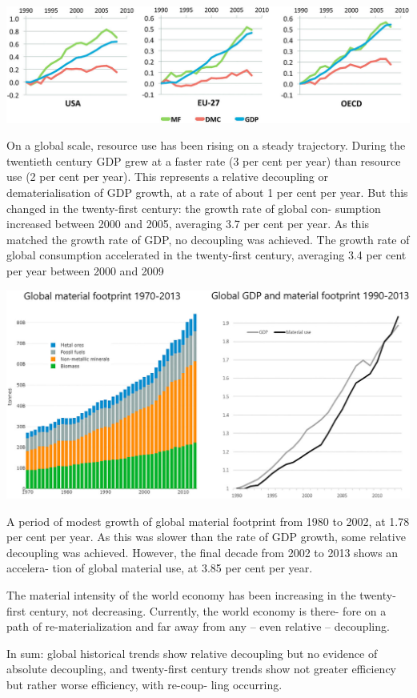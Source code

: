 \documentclass[
]{book}
\begin{document}
\includegraphics{fig/material_use.png}

On a global scale, resource use has been rising on a steady trajectory.
During the twentieth century GDP grew at a faster rate (3 per cent per year) than resource use (2 per
cent per year).
This represents a relative decoupling or dematerialisation of GDP growth, at a rate of
about 1 per cent per year. But this changed in the twenty-first century: the growth rate of global con-
sumption increased between 2000 and 2005, averaging 3.7 per cent per year. As this matched the
growth rate of GDP, no decoupling was achieved.
The growth
rate of global consumption accelerated in the twenty-first century, averaging 3.4 per cent per year
between 2000 and 2009

\includegraphics{fig/global_material_footprint.png}

A period of modest growth of global material footprint
from 1980 to 2002, at 1.78 per cent per year. As this was slower than the rate of GDP growth, some
relative decoupling was achieved. However, the final decade from 2002 to 2013 shows an accelera-
tion of global material use, at 3.85 per cent per year.

The material intensity of the world economy has been increasing
in the twenty-first century, not decreasing.
Currently, the world economy is there-
fore on a path of re-materialization and far away from any -- even relative -- decoupling.

In sum: global historical trends show relative decoupling but no evidence of absolute decoupling,
and twenty-first century trends show not greater efficiency but rather worse efficiency, with re-coup-
ling occurring.
\end{document}
